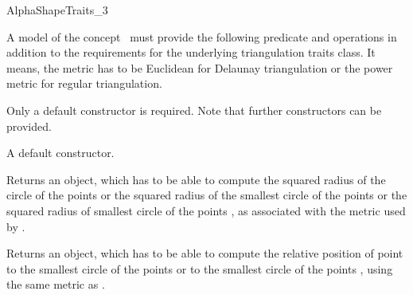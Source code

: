 \begin{ccRefConcept} {AlphaShapeTraits_3}


\ccDefinition
A model of the concept \ccRefName\  must provide the following predicate and
operations in addition to the requirements for the underlying triangulation
traits class.
It means, the metric has to be Euclidean for Delaunay triangulation or the power 
metric for regular triangulation.

\ccRefines
{}

\ccTypes


\ccCreation

Only a default constructor is required. Note that further constructors
can be provided. 

{A default constructor.}


{Returns an object, which has to be able to compute the squared radius of the
circle of the points  or the squared radius of the
smallest circle of the points  or the squared radius of smallest circle
of the points , as  associated with the metric used
by .} 


{Returns an object, which has to be able to compute the relative position of
point  to the smallest circle of the points  or 
to the smallest circle of the points , using the
same metric as .}

\end{ccRefConcept}
